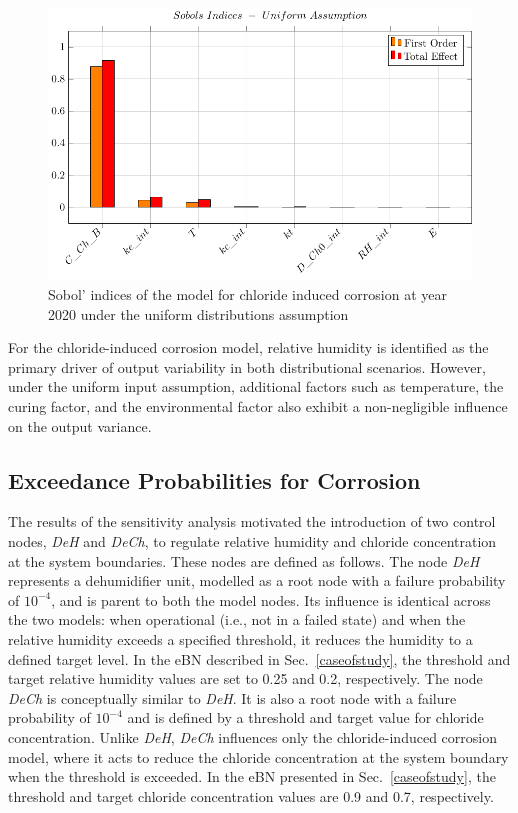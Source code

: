 \begin{figure}[H]
    \centering
    \includegraphics[width=\linewidth]{imgs/pdfs/sobols_indices/chloride/18_sobols_withRH_uniform_2020.pdf}
    \caption{Sobol' indices of the model for chloride induced corrosion at year 2020 under the uniform distributions assumption}\label{Sobol_ch_2020uniform}
\end{figure}
For the chloride-induced corrosion model, relative humidity is identified as the primary driver of output variability in both distributional scenarios. However, under the uniform input assumption, additional factors such as temperature, the curing factor, and the environmental factor also exhibit a non-negligible influence on the output variance.

\subsection{Exceedance Probabilities for Corrosion}

The results of the sensitivity analysis motivated the introduction of two control nodes, \textit{DeH} and \textit{DeCh}, to regulate relative humidity and chloride concentration at the system boundaries. These nodes are defined as follows. The node \textit{DeH} represents a dehumidifier unit, modelled as a root node with a failure probability of $10^{-4}$, and is parent to both the model nodes.
Its influence is identical across the two models: when operational (i.e., not in a failed state) and when the relative humidity exceeds a specified threshold, it reduces the humidity to a defined target level. In the eBN described in Sec.~\ref{caseofstudy}, the threshold and target relative humidity values are set to 0.25 and 0.2, respectively.
The node \textit{DeCh} is conceptually similar to \textit{DeH}. It is also a root node with a failure probability of $10^{-4}$ and is defined by a threshold and target value for chloride concentration. Unlike \textit{DeH}, \textit{DeCh} influences only the chloride-induced corrosion model, where it acts to reduce the chloride concentration at the system boundary when the threshold is exceeded. In the eBN presented in Sec.~\ref{caseofstudy}, the threshold and target chloride concentration values are 0.9 and 0.7, respectively.\\

